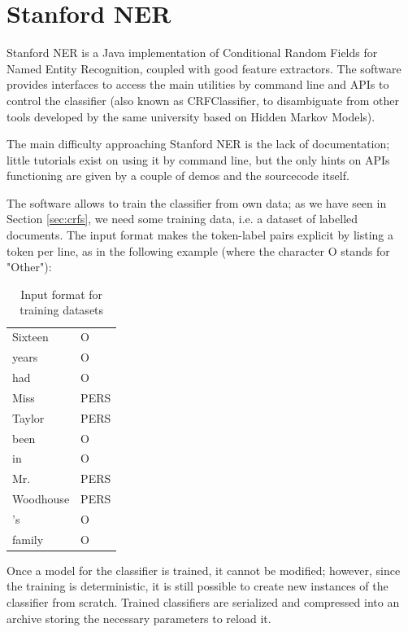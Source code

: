 \documentclass[a4paper,11pt]{report}
\begin{document}
\section{Stanford NER}
\label{sec:StfdNER}
Stanford NER \cite{finkel2005incorporating} is a Java implementation of Conditional Random Fields for Named Entity Recognition, coupled with good feature extractors. The software provides interfaces to access the main utilities by command line and APIs to control the classifier (also known as CRFClassifier, to disambiguate from other tools developed by the same university based on Hidden Markov Models).

The main difficulty approaching Stanford NER is the lack of documentation; little tutorials exist on using it by command line, but the only hints on APIs functioning are given by a couple of demos and the sourcecode itself.

The software allows to train the classifier from own data; as we have seen in Section \ref{sec:crfs}, we need some training data, i.e. a dataset of labelled documents. The input format makes the token-label pairs explicit by listing a token per line, as in the following example (where the character O stands for "Other"):


\begin{table}[h]
\begin{center}
\begin{tabular}{ll}
Sixteen &	O\\
years	& O\\
had	&O\\
Miss	&PERS\\
Taylor	&PERS\\
been	&O\\
in	&O\\
Mr.	&PERS\\
Woodhouse	&PERS\\
's	&O\\
family	&O\\

\end{tabular}
\end{center}
\caption{Input format for training datasets}
\label{tab:inputfmt}
\end{table}


Once a model for the classifier is trained, it cannot be modified; however, since the training is deterministic, it is still possible to create new instances of the classifier from scratch. Trained classifiers are serialized and compressed into an archive storing the necessary parameters to reload it.
\end{document}
